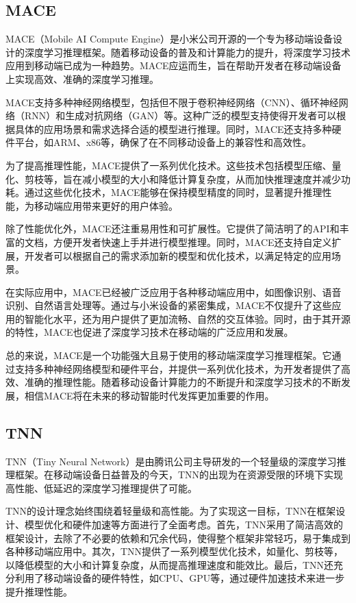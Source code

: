 \subsection{MACE}

MACE（Mobile AI Compute Engine）是小米公司开源的一个专为移动端设备设计的深度学习推理框架。随着移动设备的普及和计算能力的提升，将深度学习技术应用到移动端已成为一种趋势。MACE应运而生，旨在帮助开发者在移动端设备上实现高效、准确的深度学习推理。

MACE支持多种神经网络模型，包括但不限于卷积神经网络（CNN）、循环神经网络（RNN）和生成对抗网络（GAN）等。这种广泛的模型支持使得开发者可以根据具体的应用场景和需求选择合适的模型进行推理。同时，MACE还支持多种硬件平台，如ARM、x86等，确保了在不同移动设备上的兼容性和高效性。

为了提高推理性能，MACE提供了一系列优化技术。这些技术包括模型压缩、量化、剪枝等，旨在减小模型的大小和降低计算复杂度，从而加快推理速度并减少功耗。通过这些优化技术，MACE能够在保持模型精度的同时，显著提升推理性能，为移动端应用带来更好的用户体验。

除了性能优化外，MACE还注重易用性和可扩展性。它提供了简洁明了的API和丰富的文档，方便开发者快速上手并进行模型推理。同时，MACE还支持自定义扩展，开发者可以根据自己的需求添加新的模型和优化技术，以满足特定的应用场景。

在实际应用中，MACE已经被广泛应用于各种移动端应用中，如图像识别、语音识别、自然语言处理等。通过与小米设备的紧密集成，MACE不仅提升了这些应用的智能化水平，还为用户提供了更加流畅、自然的交互体验。同时，由于其开源的特性，MACE也促进了深度学习技术在移动端的广泛应用和发展。

总的来说，MACE是一个功能强大且易于使用的移动端深度学习推理框架。它通过支持多种神经网络模型和硬件平台，并提供一系列优化技术，为开发者提供了高效、准确的推理性能。随着移动设备计算能力的不断提升和深度学习技术的不断发展，相信MACE将在未来的移动智能时代发挥更加重要的作用。

\subsection{TNN}

TNN（Tiny Neural Network）是由腾讯公司主导研发的一个轻量级的深度学习推理框架。在移动端设备日益普及的今天，TNN的出现为在资源受限的环境下实现高性能、低延迟的深度学习推理提供了可能。

TNN的设计理念始终围绕着轻量级和高性能。为了实现这一目标，TNN在框架设计、模型优化和硬件加速等方面进行了全面考虑。首先，TNN采用了简洁高效的框架设计，去除了不必要的依赖和冗余代码，使得整个框架非常轻巧，易于集成到各种移动端应用中。其次，TNN提供了一系列模型优化技术，如量化、剪枝等，以降低模型的大小和计算复杂度，从而提高推理速度和能效比。最后，TNN还充分利用了移动端设备的硬件特性，如CPU、GPU等，通过硬件加速技术来进一步提升推理性能。

